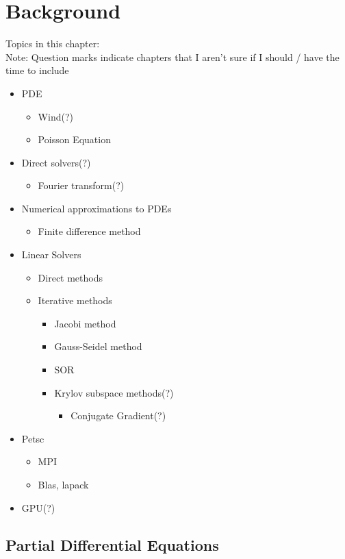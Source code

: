 \chapter{Background}

Topics in this chapter:\\
Note: Question marks indicate chapters that I aren't sure if I should / have the time to include
\begin{itemize}
	\item PDE
	\begin{itemize}
		\item Wind(?)
		\item Poisson Equation
	\end{itemize}
	\item Direct solvers(?)
	\begin{itemize}
		\item Fourier transform(?)
	\end{itemize}
	\item Numerical approximations to PDEs
	\begin{itemize}	
		\item Finite difference method
	\end{itemize}
	\item Linear Solvers
	\begin{itemize}
		\item Direct methods
		\item Iterative methods
		\begin{itemize}
			\item Jacobi method
			\item Gauss-Seidel method
			\item SOR
			\item Krylov subspace methods(?)
			\begin{itemize}
				\item Conjugate Gradient(?)
			\end{itemize}
		\end{itemize}
	\end{itemize}
	\item Petsc
	\begin{itemize}
		\item MPI
		\item Blas, lapack
	\end{itemize}
	\item GPU(?)
\end{itemize}

\section*{Partial Differential Equations}

